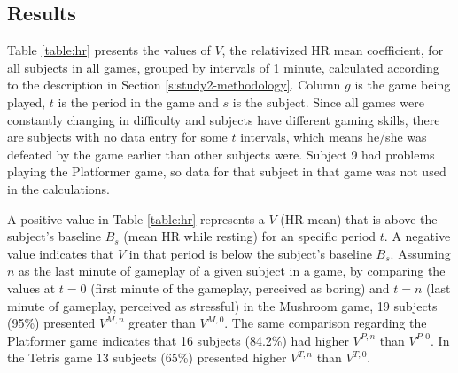 \subsection{Results}

Table \ref{table:hr} presents the values of $V$, the relativized HR mean coefficient, for all subjects in all games, grouped by intervals of 1 minute, calculated according to the description in Section \ref{s:study2-methodology}. Column $g$ is the game being played, $t$ is the period in the game and $s$ is the subject. Since all games were constantly changing in difficulty and subjects have different gaming skills, there are subjects with no data entry for some $t$ intervals, which means he/she was defeated by the game earlier than other subjects were. Subject 9 had problems playing the Platformer game, so data for that subject in that game was not used in the calculations.

A positive value in Table \ref{table:hr} represents a $V$ (HR mean) that is above the subject's baseline $B_s$ (mean HR while resting) for an specific period $t$. A negative value indicates that $V$ in that period is below the subject's baseline $B_s$. Assuming $n$ as the last minute of gameplay of a given subject in a game, by comparing the values at $t=0$ (first minute of the gameplay, perceived as boring) and $t=n$ (last minute of gameplay, perceived as stressful) in the Mushroom game, 19 subjects (95\%) presented $V^{M,n}$ greater than $V^{M,0}$. The same comparison regarding the Platformer game indicates that 16 subjects (84.2\%) had higher $V^{P,n}$ than $V^{P,0}$. In the Tetris game 13 subjects (65\%) presented higher $V^{T,n}$ than $V^{T,0}$.

